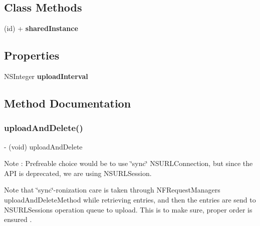 \subsection*{Class Methods}
\begin{DoxyCompactItemize}
\item 
\mbox{\label{interface_n_f_l_o_g_request_manager_a345364dbcef1eeb7af13c1bfe117580e}} 
(id) + {\bfseries shared\+Instance}
\end{DoxyCompactItemize}
\subsection*{Properties}
\begin{DoxyCompactItemize}
\item 
\mbox{\label{interface_n_f_l_o_g_request_manager_afa6110f250aa2488b759db1cd0cc3d10}} 
N\+S\+Integer {\bfseries upload\+Interval}
\end{DoxyCompactItemize}


\subsection{Method Documentation}
\mbox{\label{interface_n_f_l_o_g_request_manager_aa134b2591aa16f5577724d26e53b3eb5}} 
\subsubsection{\texorpdfstring{upload\+And\+Delete()}{uploadAndDelete()}}
{\footnotesize\ttfamily -\/ (void) upload\+And\+Delete \begin{DoxyParamCaption}{ }\end{DoxyParamCaption}}

Note \+: Prefreable choice would be to use \char`\"{}sync\char`\"{} N\+S\+U\+R\+L\+Connection, but since the A\+PI is deprecated, we are using N\+S\+U\+R\+L\+Session.

Note that \char`\"{}sync\char`\"{}-\/ronization care is taken through N\+F\+Request\+Manager\textquotesingle{}s upload\+And\+Delete\+Method while retrieving entries, and then the entries are send to N\+S\+U\+R\+L\+Session\textquotesingle{}s operation queue to upload. This is to make sure, proper order is ensured .

